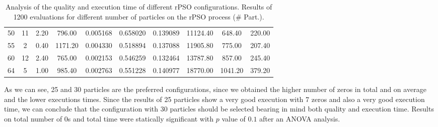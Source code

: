 \begin{table}[h]
\begin{tabular}{cccccccccc}
		\cellcolor[HTML]{C0C0C0}50          & 
		11            & 
		2.20                        & 
		796.00                         & 
		0.005168 & 
		{\color[HTML]{FE0000} 0.658020} & 
		0.139089                        & 
		11124.40                        & 
		648.40                         & 
		220.00                        \\
		
		\cellcolor[HTML]{C0C0C0}55          & 
		2             & 
		{\color[HTML]{FE0000} 0.40} & 
		{\color[HTML]{FE0000} 1171.20} & 
		0.004330                        & 
		0.518894                        & 
		0.137088                        & 
		11905.80                        & 
		775.00                         & 
		207.40                        \\
		
		\cellcolor[HTML]{C0C0C0}60          & 
		12            & 
		2.40                        & 
		765.00                         & 
		{\color[HTML]{FE0000} 0.002153}                        & 
		0.546259                        & 
		0.132464                        & 
		13787.80                        & 
		857.00                         & 
		245.40                        \\
		
		\cellcolor[HTML]{C0C0C0}64          & 
		5             & 
		1.00                        & 
		985.40                         & 
		0.002763                        & 
		0.551228                        & 
		0.140977                        & 
		{\color[HTML]{FE0000} 18770.00} & 
		{\color[HTML]{FE0000} 1041.20} & 
		{\color[HTML]{FE0000} 379.20} \\ 
		
		\hline
	\end{tabular}
	\caption{Analysis of the quality and execution time of different rPSO configurations. Results of 1200 evaluations for different number of particles on the rPSO process (\# Part.).}
	\label{tab.color}
\end{table}

As we can see, 25 and 30 particles are the preferred configurations, since we obtained the higher number of zeros in total and on average and the lower executions times. Since the results of 25 particles show a very good execution with 7 zeros and also a very good execution time, we can conclude that the configuration with 30 particles should be selected bearing in mind both quality and execution time. Results on total number of 0s and total time were statically significant with $p$ value of $0.1$ after an ANOVA analysis.


